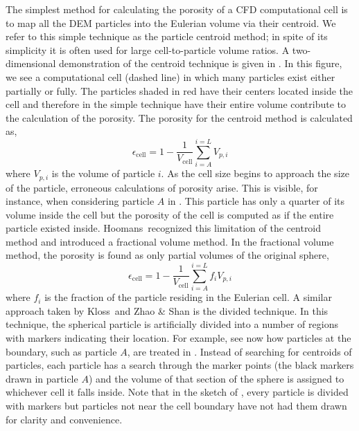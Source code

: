 The simplest method for calculating the porosity of a CFD computational cell is to map all the DEM particles into the Eulerian volume via their centroid. We refer to this simple technique as the particle centroid method; in spite of its simplicity it is often used for large cell-to-particle volume ratios.\cite{Xu1997} A two-dimensional demonstration of the centroid technique is given in . In this figure, we see a computational cell (dashed line) in which many particles exist either partially or fully. The particles shaded in red have their centers located inside the cell and therefore in the simple technique have their entire volume contribute to the calculation of the porosity. The porosity for the centroid method is calculated as,
\begin{equation}
	\epsilon_\text{cell} = 1-\frac{1}{V_\text{cell}}\sum_{i = A}^{i=L}V_{p,i}
\end{equation}
where $V_{p,i}$ is the volume of particle $i$. As the cell size begins to approach the size of the particle, erroneous calculations of porosity arise. This is visible, for instance, when considering particle $A$ in . This particle has only a quarter of its volume inside the cell but the porosity of the cell is computed as if the entire particle existed inside. Hoomans\etal~recognized this limitation of the centroid method and introduced a fractional volume method.\cite{Hoomans1996} In the fractional volume method, the porosity is found as only partial volumes of the original sphere,
\begin{equation}
	\epsilon_\text{cell} = 1-\frac{1}{V_\text{cell}}\sum_{i = A}^{i=L}f_iV_{p,i}
\end{equation}
where $f_i$ is the fraction of the particle residing in the Eulerian cell. A similar approach taken by Kloss\etal~and Zhao \& Shan is the divided technique.\cite{Kloss2012,Zhao2013a} In this technique, the spherical particle is artificially divided into a number of regions with markers indicating their location. For example, see now how particles at the boundary, such as particle $A$, are treated in . Instead of searching for centroids of particles, each particle has a search through the marker points (the black markers drawn in particle $A$) and the volume of that section of the sphere is assigned to whichever cell it falls inside. Note that in the sketch of , every particle is divided with markers but particles not near the cell boundary have not had them drawn for clarity and convenience.


